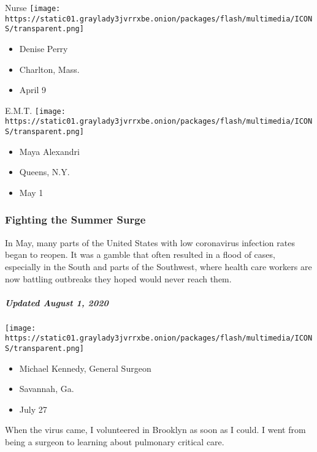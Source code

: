 \protect\hyperlink{item-denise-perry}{}

Nurse
\texttt{[image: https://static01.graylady3jvrrxbe.onion/packages/flash/multimedia/ICONS/transparent.png]}

\begin{itemize}
\tightlist
\item
  Denise Perry
\item
  Charlton, Mass.
\item
  April 9
\end{itemize}

\protect\hyperlink{item-maya-alexandri}{}

E.M.T.
\texttt{[image: https://static01.graylady3jvrrxbe.onion/packages/flash/multimedia/ICONS/transparent.png]}

\begin{itemize}
\tightlist
\item
  Maya Alexandri
\item
  Queens, N.Y.
\item
  May 1
\end{itemize}

\hypertarget{fighting-the-summer-surge-1}{%
\subsubsection{Fighting the Summer
Surge}\label{fighting-the-summer-surge-1}}

In May, many parts of the United States with low coronavirus infection
rates began to reopen. It was a gamble that often resulted in a flood of
cases, especially in the South and parts of the Southwest, where health
care workers are now battling outbreaks they hoped would never reach
them.

\hypertarget{updated-august-1-2020-2}{%
\subparagraph{Updated August 1, 2020}\label{updated-august-1-2020-2}}

\texttt{[image: https://static01.graylady3jvrrxbe.onion/packages/flash/multimedia/ICONS/transparent.png]}

\begin{itemize}
\tightlist
\item
  Michael Kennedy, General Surgeon
\item
  Savannah, Ga.
\item
  July 27
\end{itemize}

When the virus came, I volunteered in Brooklyn as soon as I could. I
went from being a surgeon to learning about pulmonary critical care.

